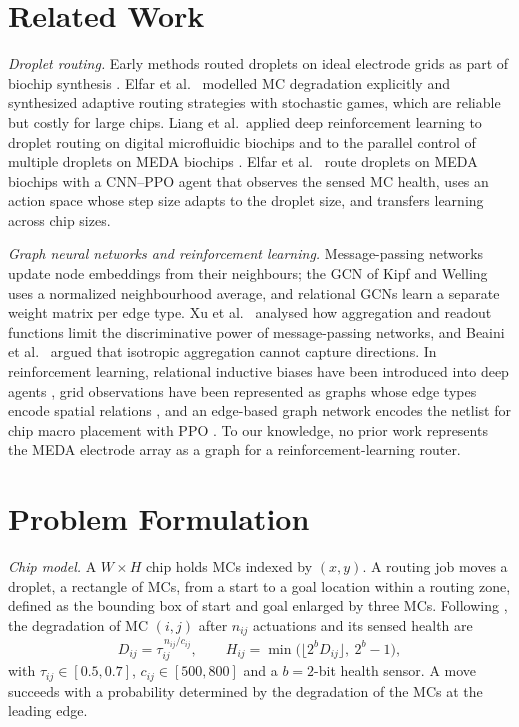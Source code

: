 \documentclass[conference,onecolumn,11pt]{IEEEtran}
\begin{document}
\section{Related Work}
\textit{Droplet routing.} Early methods routed droplets on ideal electrode grids as part of
biochip synthesis \cite{su2006}. Elfar et al.\ \cite{elfar2021date,elfar2022tcad} modelled MC
degradation explicitly and synthesized adaptive routing strategies with stochastic games,
which are reliable but costly for large chips. Liang et al.\ applied deep reinforcement
learning to droplet routing on digital microfluidic biochips \cite{liang2020} and to the
parallel control of multiple droplets on MEDA biochips \cite{liang2021}. Elfar et al.\
\cite{elfar2022date,elfar2023} route droplets on MEDA biochips with a CNN--PPO agent that
observes the sensed MC health, uses an action space whose step size adapts to the droplet
size, and transfers learning across chip sizes.

\textit{Graph neural networks and reinforcement learning.} Message-passing networks
\cite{gilmer2017} update node embeddings from their neighbours; the GCN of Kipf and Welling
\cite{kipf2017} uses a normalized neighbourhood average, and relational GCNs
\cite{schlichtkrull2018} learn a separate weight matrix per edge type. Xu et al.\
\cite{xu2019} analysed how aggregation and readout functions limit the discriminative power
of message-passing networks, and Beaini et al.\ \cite{beaini2021} argued that isotropic
aggregation cannot capture directions. In reinforcement learning, relational inductive
biases have been introduced into deep agents \cite{zambaldi2019}, grid observations have
been represented as graphs whose edge types encode spatial relations \cite{jiang2021}, and
an edge-based graph network encodes the netlist for chip macro placement with PPO
\cite{mirhoseini2021}. To our knowledge, no prior work represents the MEDA electrode array as
a graph for a reinforcement-learning router.

\section{Problem Formulation}
\textit{Chip model.} A $W\times H$ chip holds MCs indexed by $(x,y)$. A routing job moves a
droplet, a rectangle of MCs, from a start to a goal location within a routing zone, defined
as the bounding box of start and goal enlarged by three MCs. Following \cite{elfar2023}, the
degradation of MC $(i,j)$ after $n_{ij}$ actuations and its sensed health are
\begin{equation}
  D_{ij}=\tau_{ij}^{\,n_{ij}/c_{ij}},\qquad
  H_{ij}=\min\!\big(\lfloor 2^{b} D_{ij}\rfloor,\ 2^{b}-1\big),
\end{equation}
with $\tau_{ij}\in[0.5,0.7]$, $c_{ij}\in[500,800]$ and a $b=2$-bit health sensor. A move
succeeds with a probability determined by the degradation of the MCs at the leading edge.
\end{document}
